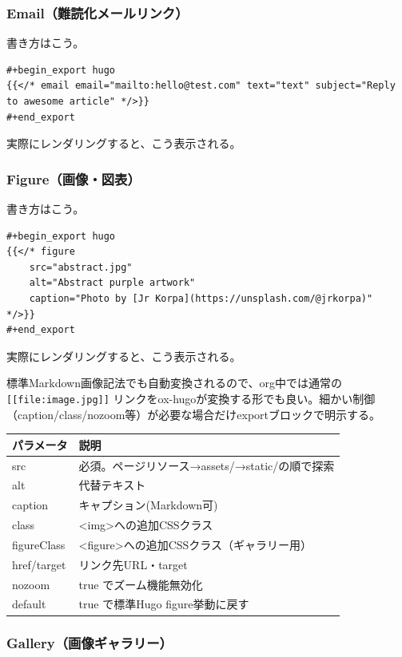 \documentclass[11pt]{article}
\begin{document}
\subsubsection{Email（難読化メールリンク）}
\label{sec:orge8d389e}

書き方はこう。

\begin{verbatim}
#+begin_export hugo
{{</* email email="mailto:hello@test.com" text="text" subject="Reply to awesome article" */>}}
#+end_export
\end{verbatim}

実際にレンダリングすると、こう表示される。
\subsubsection{Figure（画像・図表）}
\label{sec:org6098226}

書き方はこう。

\begin{verbatim}
#+begin_export hugo
{{</* figure
    src="abstract.jpg"
    alt="Abstract purple artwork"
    caption="Photo by [Jr Korpa](https://unsplash.com/@jrkorpa)"
*/>}}
#+end_export
\end{verbatim}

実際にレンダリングすると、こう表示される。

標準Markdown画像記法でも自動変換されるので、org中では通常の \texttt{[[file:image.jpg]]} リンクをox-hugoが変換する形でも良い。細かい制御（caption/class/nozoom等）が必要な場合だけexportブロックで明示する。

\begin{center}
\begin{tabular}{ll}
パラメータ & 説明\\
\hline
src & 必須。ページリソース→assets/→static/の順で探索\\
alt & 代替テキスト\\
caption & キャプション(Markdown可)\\
class & <img>への追加CSSクラス\\
figureClass & <figure>への追加CSSクラス（ギャラリー用）\\
href/target & リンク先URL・target\\
nozoom & true でズーム機能無効化\\
default & true で標準Hugo figure挙動に戻す\\
\end{tabular}
\end{center}
\subsubsection{Gallery（画像ギャラリー）}
\label{sec:org9f5a0d1}
\end{document}
